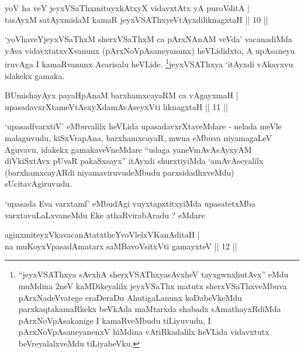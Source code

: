 \begin{shl}
yoV ha veY jeyxVSaThxmituyxkAtxyX vidavxtAtx yA puroVditA | \\
tasAyxM satAyxmidaM kamaR jeyxVSAThxyeVtAyxdiliknagxtaH \hfill|| 10 || 
\end{shl}

\begin{artha}
`yoVhaveYjeyxVSaThxM sherxVSaThxM ca pArxNAnAM veVda' vacanadiMda yAva vidavxtatxvXvanunx (pArxNoVpAsaneyanunx) heVLididxto, A upAsaneyu iruvAga I kamaRvanunx Acarisalu heVLide. \footnote{``jeyxVSAThxya sAvxhA sherxVSAThxyasAvxheV tayxgwnxhutAvx'' eMdu muMdina 2neV kaMDikeyalilx jeyxVSaThx matutx sherxVSaThxveMbuva pArxNadeVvatege eraDeraDu AhutigaLanunx koDabeVkeMdu parxkaqtakamaRkekx beVkAda maMtarxda shabadx sAmathayxRdiMda pArxNoVpAsakanige I kamaRveMbudu tiLiyuvudu, I pArxNoVpAsaneyanenxV hiMdina vAtiRkadalilx heVLida vidavxtutx beVreyalalxveMdu tiLiyabeVku.}jeyxVSAThxya `itAyxdi vAkayxvu idakekx gamaka.
\end{artha}

\begin{shl}
BUmishayAyx payaHpAnaM barxhamxcayaRM ca vAgayxmaH | \\
upasadavxrXtameVtAsxyXdamAvAseyxVti liknagxtaH \hfill|| 11 || 
\end{shl}

\begin{artha}
`upasadfvarxtiV' eMbuvalilx heVLida upasadavxrXtaveMdare - nelada meVle malaguvudu, kiSxVrapAna, barxhamxcayaR, mwna eMbuva niyamagaLeV Aguvavu, idakekx gamakaveVneMdare ``udaga yaneV\s mAvAsAyxyAM diVkiSxtAvx pUvaR pakaSxsayx'' itAyxdi shurxtiyiMda `amAvAseyalilx (barxhamxcayARdi niyamaviruvudeMbudu parxsidadhxveMdu) sUcitavAgiruvudu.
\end{artha}

\begin{artha}
`upasada Eva varxtamf' eMbudAgi vuyxtapxtitxyiMda upasatetxMba varxtavuLaLxva\-neMdu Eke athaRvirabAradu ? eMdare
\end{artha}

\begin{shl}
aginxmiteyxVkavacanAtatxtheYvoVlelxVKanAditaH | \\
na muKoyxVpasadAmatarx saMBavoV\s sitxVti gamayxteV \hfill|| 12 || 
\end{shl}

